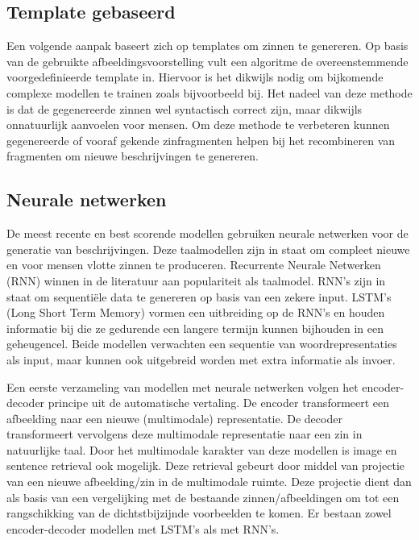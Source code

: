 \subsection{Template gebaseerd}
Een volgende aanpak baseert zich op templates om zinnen te genereren. Op basis van de gebruikte afbeeldingsvoorstelling vult een algoritme de overeenstemmende voorgedefinieerde template in.\cite{Yang2011} Hiervoor is het dikwijls nodig om bijkomende complexe modellen te trainen zoals bijvoorbeeld bij\cite{Elliott2013}. Het nadeel van deze methode is dat de gegenereerde zinnen wel syntactisch correct zijn, maar dikwijls onnatuurlijk aanvoelen voor mensen. Om deze methode te verbeteren kunnen gegenereerde of vooraf gekende zinfragmenten helpen bij het recombineren van fragmenten om nieuwe beschrijvingen te genereren. \cite{Mitchell2012,Kuznetsova2012}

\subsection{Neurale netwerken}
De meest recente en best scorende modellen gebruiken neurale netwerken voor de generatie van beschrijvingen. Deze taalmodellen zijn in staat om compleet nieuwe en voor mensen vlotte zinnen te produceren. Recurrente Neurale Netwerken (RNN)\cite{Mikolov2010} winnen in de literatuur aan populariteit als taalmodel. RNN's zijn in staat om sequenti\"ele data te genereren op basis van een zekere input. LSTM's (Long Short Term Memory)\cite{SeppHochreiter1997} vormen een uitbreiding op de RNN's en houden informatie bij die ze gedurende een langere termijn kunnen bijhouden in een geheugencel. Beide modellen verwachten een sequentie van woordrepresentaties als input, maar kunnen ook uitgebreid worden met extra informatie als invoer. \cite{Kiros2014,Xu2015,Socher2014,Jin2015,Fernando2015} 

Een eerste verzameling van modellen met neurale netwerken volgen het encoder-decoder principe uit de automatische vertaling.\cite{Kiros2014} De encoder transformeert een afbeelding naar een nieuwe (multimodale) representatie. De decoder transformeert vervolgens deze multimodale representatie naar een zin in natuurlijke taal. Door het multimodale karakter van deze modellen is image en sentence retrieval ook mogelijk. Deze retrieval gebeurt door middel van projectie van een nieuwe afbeelding/zin in de multimodale ruimte. Deze projectie dient dan als basis van een vergelijking met de bestaande zinnen/afbeeldingen om tot een rangschikking van de dichtstbijzijnde voorbeelden te komen.  Er bestaan zowel encoder-decoder modellen met LSTM's\cite{Kiros2014} als met RNN's\cite{Karpathy2014,Mao2014a}.

